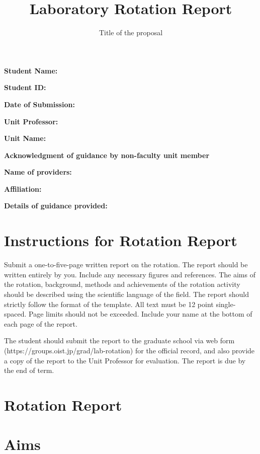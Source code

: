 \documentclass[paper=a4wide, fontsize=12pt]{scrartcl}	 %
\title{\vspace{-1.8cm}  \color{DarkRed} Laboratory Rotation Report}
\subtitle{Title of the proposal %
\vspace{-2cm} }
\date{} %
\begin{document}
\maketitle %
\thispagestyle{fancy} %


\vspace{-0.5cm} \textbf{Student Name:}

\textbf{Student ID:}

\textbf{Date of Submission:}

\textbf{Unit Professor:}

\textbf{Unit Name:}

\vspace{3mm} \textbf{Acknowledgment of guidance by non-faculty unit member}

\textbf{Name of providers:}

\textbf{Affiliation:}

\textbf{Details of guidance provided:}


\vspace{0.5cm}

\section*{Instructions for Rotation Report}

Submit a one-to-five-page written report on the rotation. The report should be written entirely by you. Include any necessary figures and references. The aims of the rotation, background, methods and achievements of the rotation activity should be described using the scientific language of the field. 
The report should strictly follow the format of the template. All text must be 12 point single-spaced. Page limits should not be exceeded. Include your name at the bottom of each page of the report.

The student should submit the report to the graduate school via web form (https://groups.oist.jp/grad/lab-rotation) for the official record, and also provide a copy of the report to the Unit Professor for evaluation. The report is due by the end of term. 


\section*{Rotation Report}


\section*{Aims}
\end{document}

